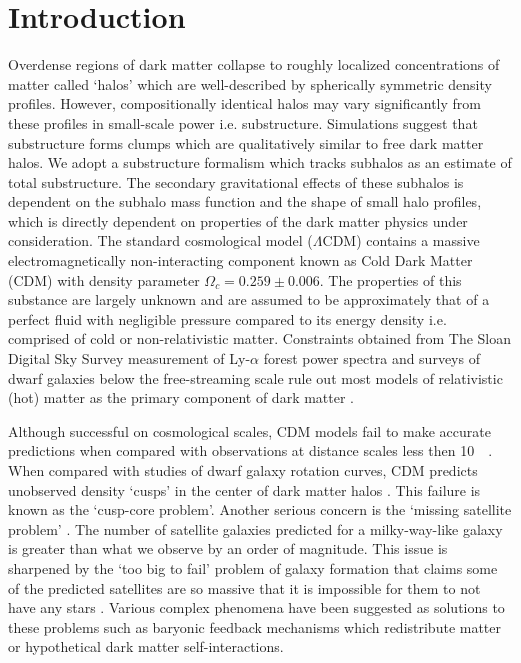 \documentclass[usenatbib]{mnras}
\newcommand{\squote}[1]{\lq #1\rq}
\newcommand{\lcdm}{$\Lambda$CDM}
\begin{document}
\section{Introduction}
	Overdense regions of dark matter collapse to roughly localized concentrations of matter called ‘halos’ which are well-described by spherically symmetric density profiles. However, compositionally identical halos may vary significantly from these profiles in small-scale power i.e. substructure. Simulations suggest that substructure forms clumps which are qualitatively similar to free dark matter halos. We adopt a substructure formalism which tracks subhalos as an estimate of total substructure. The secondary gravitational effects of these subhalos is dependent on the subhalo mass function and the shape of small halo profiles, which is directly dependent on properties of the dark matter physics under consideration.                
        The standard cosmological model (\lcdm) contains a massive electromagnetically non-interacting component known as Cold Dark Matter (CDM) with density parameter $\Omega_c = 0.259 \pm 0.006$. The properties of this substance are largely unknown and are assumed to be approximately that of a perfect fluid with negligible pressure compared to its energy density i.e. comprised of cold or non-relativistic matter. Constraints obtained from The Sloan Digital Sky Survey measurement of Ly-$\alpha$ forest power spectra and surveys of dwarf galaxies below the free-streaming scale rule out most models of relativistic (hot) matter as the primary component of dark matter \citep{can_neutrinos}. 
\par
        Although successful on cosmological scales, CDM models fail to make accurate predictions when compared with observations at distance scales less then \SI{10}{\kilo\parsec}. When compared with studies of dwarf galaxy rotation curves, CDM predicts unobserved density \squote{cusps} in the center of dark matter halos \citep{ultralight}. This failure is known as the \squote{cusp-core problem}. Another serious concern is the \squote{missing satellite problem}  \citep{missing_satellites}. The number of satellite galaxies predicted for a milky-way-like galaxy is greater than what we observe by an order of magnitude. This issue is sharpened by the \squote{too big to fail} problem of galaxy formation that claims some of the predicted satellites are so massive that it is impossible for them to not have any stars \citep{too_big_to_fail}. Various complex phenomena have been suggested as solutions to these problems such as baryonic feedback mechanisms which redistribute matter or  hypothetical dark matter self-interactions.
\end{document}

